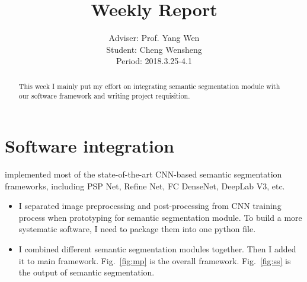 \documentclass[]{IEEEtran}
\begin{document}
	\title{Weekly Report}
	\author{Adviser: Prof. Yang Wen \\Student: Cheng Wensheng\\ Period: 2018.3.25-4.1
	}
	\maketitle

\begin{abstract}
	This week I mainly put my effort on integrating semantic segmentation module with our software framework and writing project requisition. 
\end{abstract}

\section{Software integration}
	 implemented most of the state-of-the-art CNN-based semantic segmentation frameworks, including PSP Net, Refine Net, FC DenseNet, DeepLab V3, etc.
	\begin{itemize}
		\item I separated image preprocessing and post-processing from CNN training process when prototyping for semantic segmentation module. To build a more systematic software, I need to package them into one python file.
		\item I combined different semantic segmentation modules together. Then I added it to main framework. Fig.~\ref{fig:mp} is the overall framework. Fig.~\ref{fig:ss} is the output of semantic segmentation.
	\end{itemize}

\end{document}
